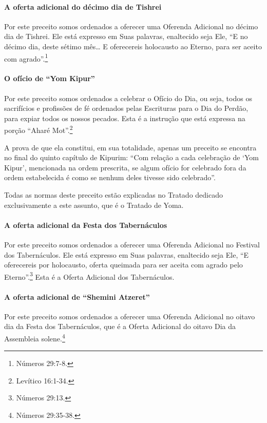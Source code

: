\paragraph{A oferta adicional do décimo dia de Tishrei}

Por este preceito somos ordenados a oferecer uma Oferenda Adicional no
décimo dia de Tishrei. Ele está expresso em Suas palavras,
enaltecido seja Ele, ``E no décimo dia, deste sétimo mês\ldots{} E
oferecereis holocausto ao Eterno, para ser aceito com agrado''.\footnote{Números
29:7-8.}

\paragraph{O ofício de ``Yom Kipur''}

Por este preceito somos ordenados a celebrar o Ofício do Dia, ou seja,
todos os sacrifícios e profissões de fé ordenados pelas Escrituras para
o Dia do Perdão, para expiar todos os nossos pecados. Esta é a instrução
que está expressa na porção ``Aharé Mot''.\footnote{Levítico 16:1-34.}

A prova de que ela constitui, em sua totalidade, apenas um preceito se
encontra no final do quinto capítulo de Kipurim: ``Com relação a cada
celebração de `Yom Kipur', mencionada na ordem prescrita, se algum
ofício for celebrado fora da ordem estabelecida é como se nenhum deles
tivesse sido celebrado''.

Todas as normas deste preceito estão explicadas no Tratado dedicado
exclusivamente a este assunto, que é o Tratado de Yoma.

\paragraph{A oferta adicional da Festa dos Tabernáculos}

Por este preceito somos ordenados a oferecer uma Oferenda Adicional no
Festival dos Tabernáculos. Ele está expresso em Suas palavras,
enaltecido seja Ele, ``E oferecereis por holocausto, oferta queimada
para ser aceita com agrado pelo Eterno''.\footnote{Números 29:13.} Esta é a
Oferta Adicional dos Tabernáculos.

\paragraph{A oferta adicional de ``Shemini Atzeret''}

Por este preceito somos ordenados a oferecer uma Oferenda Adicional no
oitavo dia da Festa dos Tabernáculos, que é a Oferta Adicional do oitavo
Dia da Assembleia solene.\footnote{Números 29:35-38.}

